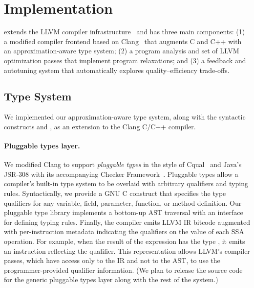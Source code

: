 \section{Implementation}
\label{sec:impl}

\sysname extends the LLVM compiler
infrastructure~\cite{llvm} and has three main components:
(1) a modified compiler frontend based on Clang~\cite{clang}
that augments C and C++ with an
approximation-aware type system;
(2) a program analysis and set of LLVM optimization passes that implement
program relaxations; and
(3) a feedback and autotuning system that automatically explores
quality--efficiency trade-offs.

\subsection{Type System}

We implemented our approximation-aware type system, along with the syntactic
constructs  and , as an extension to the Clang
C/C++ compiler.

\paragraph{Pluggable types layer.}

We modified Clang to support \emph{pluggable types} in the style of
Cqual~\cite{cqual} and Java's JSR-308 with its accompanying Checker
Framework~\cite{jsr308, papi}.
Pluggable types allow a compiler's built-in type system to be overlaid with
arbitrary qualifiers and typing rules. Syntactically, we
provide a GNU C  construct that specifies the
type qualifiers for any variable, field, parameter, function, or method
definition. Our pluggable type library implements a bottom-up AST traversal
with an interface for defining typing rules.
Finally, the compiler emits LLVM IR bitcode
augmented with per-instruction metadata indicating the qualifiers on the
value of each SSA operation. For example, when the result of the
expression  has the type , it emits an
 instruction reflecting the qualifier. This
representation allows LLVM's compiler passes, which have access only to the IR
and not to the AST, to use the programmer-provided qualifier
information.
(We plan to release the source code for the generic
pluggable types layer along with the rest of the
system.)


